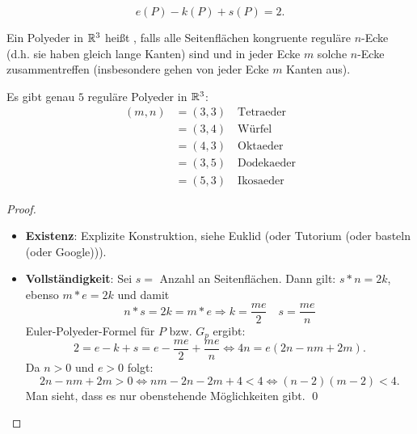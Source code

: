 \begin{deduction}
  \begin{equation*}
    e(P) - k(P) + s(P) = 2\text{.}
  \end{equation*}
\end{deduction}

\begin{definition}
  Ein Polyeder in $ \mathbb{R}^3 $ heißt \label{def:regulaererPolyeder}, falls alle Seitenflächen kongruente reguläre $ n $-Ecke (d.h. sie haben gleich lange Kanten) sind und in jeder Ecke $ m $ solche $ n $-Ecke zusammentreffen (insbesondere gehen von jeder Ecke $ m $ Kanten aus).
\end{definition}

\begin{theorem}
  Es gibt genau $ 5 $ reguläre Polyeder in $ \mathbb{R}^3 $:
  \begin{align*}
    (m,n) &= (3,3) \quad \text{Tetraeder}  \\
     &= (3,4) \quad \text{Würfel} \\
     &= (4,3) \quad \text{Oktaeder} \\
     &= (3,5) \quad \text{Dodekaeder} \\
     &= (5,3) \quad \text{Ikosaeder}
  \end{align*}
  \begin{proof}
    \
    \begin{itemize}
      \item \textbf{Existenz}: Explizite Konstruktion, siehe Euklid (oder Tutorium (oder basteln (oder Google))).
      \item \textbf{Vollständigkeit}: Sei $ s = $ Anzahl an Seitenflächen. Dann gilt: $ s*n = 2k $, ebenso $ m*e = 2k $ und damit
        \begin{equation*}
          n*s = 2k = m*e \Rightarrow k = \frac{me}{2} \quad s = \frac{me}{n}
        \end{equation*}
        Euler-Polyeder-Formel für $ P $ bzw. $ G_p $ ergibt:
        \begin{equation*}
          2 = e-k+s = e - \frac{me}{2} + \frac{me}{n} \Leftrightarrow 4n = e\left( 2n - nm + 2m \right)\text{.}
        \end{equation*}
        Da $ n > 0 $ und $ e > 0 $ folgt:
        \begin{equation*}
          2n - nm + 2m > 0 \Leftrightarrow nm - 2n - 2m + 4 < 4 \Leftrightarrow (n-2)(m-2) < 4\text{.}
        \end{equation*}
        Man sieht, dass es nur obenstehende Möglichkeiten gibt. \qed
    \end{itemize}
  \end{proof}
\end{theorem}
